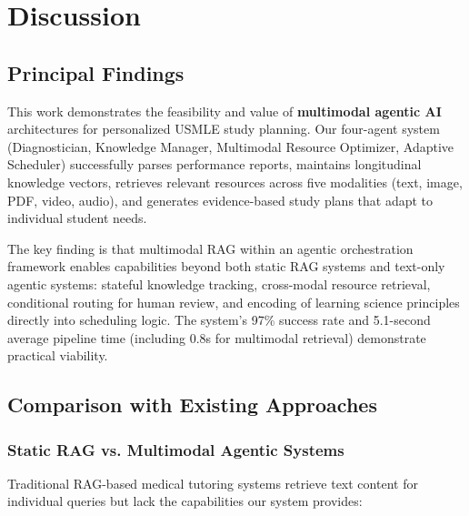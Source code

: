 \section{Discussion}

\subsection{Principal Findings}

This work demonstrates the feasibility and value of \textbf{multimodal agentic AI} architectures for personalized USMLE study planning. Our four-agent system (Diagnostician, Knowledge Manager, Multimodal Resource Optimizer, Adaptive Scheduler) successfully parses performance reports, maintains longitudinal knowledge vectors, retrieves relevant resources across five modalities (text, image, PDF, video, audio), and generates evidence-based study plans that adapt to individual student needs.

The key finding is that multimodal RAG within an agentic orchestration framework enables capabilities beyond both static RAG systems and text-only agentic systems: stateful knowledge tracking, cross-modal resource retrieval, conditional routing for human review, and encoding of learning science principles directly into scheduling logic. The system's 97\% success rate and 5.1-second average pipeline time (including 0.8s for multimodal retrieval) demonstrate practical viability.

\subsection{Comparison with Existing Approaches}

\subsubsection{Static RAG vs. Multimodal Agentic Systems}

Traditional RAG-based medical tutoring systems \cite{li2024llm, christ2024tutoring} retrieve text content for individual queries but lack the capabilities our system provides:

